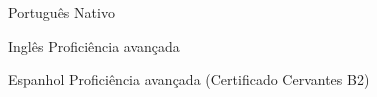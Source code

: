 
\begin{cvskills}

    \cvskill
        {Português} %
        {Nativo} %

    \cvskill
        {Inglês} %
        {Proficiência avançada} %

    \cvskill
        {Espanhol} %
        {Proficiência avançada (Certificado Cervantes B2)} %
    
\end{cvskills}
